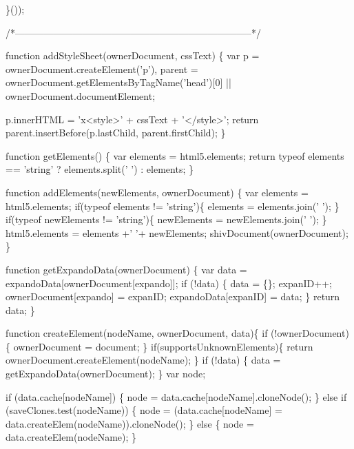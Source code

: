 \begin{DoxyCodeInclude}
  \}());

  \textcolor{comment}{/*--------------------------------------------------------------------------*/}

  \textcolor{keyword}{function} addStyleSheet(ownerDocument, cssText) \{
    var p = ownerDocument.createElement(\textcolor{charliteral}{'p'}),
        parent = ownerDocument.getElementsByTagName(\textcolor{stringliteral}{'head'})[0] || ownerDocument.documentElement;

    p.innerHTML = \textcolor{stringliteral}{'x<style>'} + cssText + \textcolor{stringliteral}{'</style>'};
    \textcolor{keywordflow}{return} parent.insertBefore(p.lastChild, parent.firstChild);
  \}

  \textcolor{keyword}{function} getElements() \{
    var elements = html5.elements;
    \textcolor{keywordflow}{return} typeof elements == \textcolor{stringliteral}{'string'} ? elements.split(\textcolor{charliteral}{' '}) : elements;
  \}

  \textcolor{keyword}{function} addElements(newElements, ownerDocument) \{
    var elements = html5.elements;
    \textcolor{keywordflow}{if}(typeof elements != \textcolor{stringliteral}{'string'})\{
      elements = elements.join(\textcolor{charliteral}{' '});
    \}
    \textcolor{keywordflow}{if}(typeof newElements != \textcolor{stringliteral}{'string'})\{
      newElements = newElements.join(\textcolor{charliteral}{' '});
    \}
    html5.elements = elements +\textcolor{charliteral}{' '}+ newElements;
    shivDocument(ownerDocument);
  \}

  \textcolor{keyword}{function} getExpandoData(ownerDocument) \{
    var data = expandoData[ownerDocument[expando]];
    \textcolor{keywordflow}{if} (!data) \{
        data = \{\};
        expanID++;
        ownerDocument[expando] = expanID;
        expandoData[expanID] = data;
    \}
    \textcolor{keywordflow}{return} data;
  \}

  \textcolor{keyword}{function} createElement(nodeName, ownerDocument, data)\{
    \textcolor{keywordflow}{if} (!ownerDocument) \{
        ownerDocument = document;
    \}
    \textcolor{keywordflow}{if}(supportsUnknownElements)\{
        \textcolor{keywordflow}{return} ownerDocument.createElement(nodeName);
    \}
    \textcolor{keywordflow}{if} (!data) \{
        data = getExpandoData(ownerDocument);
    \}
    var node;

    \textcolor{keywordflow}{if} (data.cache[nodeName]) \{
        node = data.cache[nodeName].cloneNode();
    \} \textcolor{keywordflow}{else} \textcolor{keywordflow}{if} (saveClones.test(nodeName)) \{
        node = (data.cache[nodeName] = data.createElem(nodeName)).cloneNode();
    \} \textcolor{keywordflow}{else} \{
        node = data.createElem(nodeName);
    \}


\end{DoxyCodeInclude}
